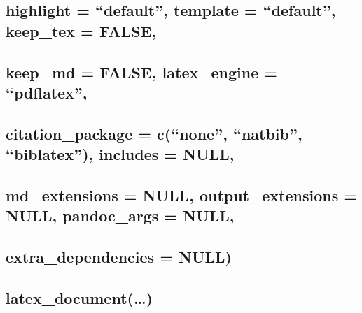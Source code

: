\documentclass[]{article}
\begin{document}
\hypertarget{highlight-default-template-default-keep_tex-false}{%
\subsection{highlight = ``default'', template = ``default'', keep\_tex =
FALSE,}\label{highlight-default-template-default-keep_tex-false}}

\hypertarget{keep_md-false-latex_engine-pdflatex}{%
\subsection{keep\_md = FALSE, latex\_engine =
``pdflatex'',}\label{keep_md-false-latex_engine-pdflatex}}

\hypertarget{citation_package-cnone-natbib-biblatex-includes-null}{%
\subsection{citation\_package = c(``none'', ``natbib'', ``biblatex''),
includes =
NULL,}\label{citation_package-cnone-natbib-biblatex-includes-null}}

\hypertarget{md_extensions-null-output_extensions-null-pandoc_args-null}{%
\subsection{md\_extensions = NULL, output\_extensions = NULL,
pandoc\_args =
NULL,}\label{md_extensions-null-output_extensions-null-pandoc_args-null}}

\hypertarget{extra_dependencies-null}{%
\subsection{extra\_dependencies = NULL)}\label{extra_dependencies-null}}

\hypertarget{section-2}{%
\subsection{}\label{section-2}}

\hypertarget{latex_document}{%
\subsection{latex\_document(\ldots)}\label{latex_document}}

\hypertarget{section-3}{%
\subsection{}\label{section-3}}
\end{document}
